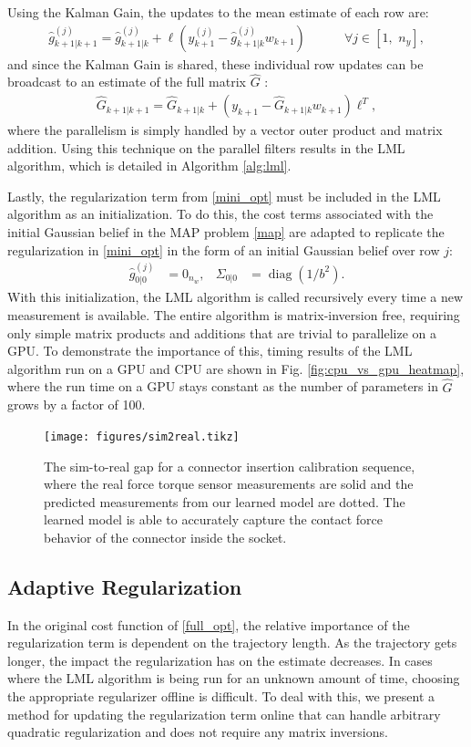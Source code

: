 Using the Kalman Gain, the updates to the mean estimate of each row are:
%
\begin{align}
    \hat{g}^{(j)}_{k+1|k+1} = \hat{g}^{(j)}_{k+1|k} + \ell (y_{k+1}^{(j)} - \hat{g}^{(j)}_{k+1|k} w_{k+1}) \quad \quad \quad \forall j \in [1, \,\,n_y],
\end{align}
%
and since the Kalman Gain is shared, these individual row updates can be broadcast to an estimate of the full matrix $\hat{G}$ :
\begin{align}
    \hat{G}_{k+1|k+1} = \hat{G}_{k+1|k} + (y_{k+1} - \hat{G}_{k+1|k} w_{k+1})\ell^T,
\end{align}
where the parallelism is simply handled by a vector outer product and matrix addition. Using this technique on the parallel filters results in the LML algorithm, which is detailed in Algorithm \ref{alg:lml}.

Lastly, the regularization term from \eqref{mini_opt} must be included in the LML algorithm as an initialization. To do this, the cost terms associated with the initial Gaussian belief in the MAP problem \eqref{map} are adapted to replicate the regularization in \eqref{mini_opt} in the form of an initial Gaussian belief over row $j$:
%
\begin{align}
    \hat{g}^{(j)}_{0|0} &= 0_{n_w}, & \Sigma_{0|0} &= \operatorname{diag}(1 / b^2). \label{eq:init_reg}
\end{align}
%
With this initialization, the LML algorithm is called recursively every time a new measurement is available. The entire algorithm is matrix-inversion free, requiring only simple matrix products and additions that are trivial to parallelize on a GPU. To demonstrate the importance of this, timing results of the LML algorithm run on a GPU and CPU are shown in Fig. \ref{fig:cpu_vs_gpu_heatmap}, where the run time on a GPU stays constant as the number of parameters in $\hat{G}$ grows by a factor of 100. 
%
\begin{figure}
    \centering
    \texttt{[image: figures/sim2real.tikz]}
    \caption{The sim-to-real gap for a connector insertion calibration sequence, where the real force torque sensor measurements are solid and the predicted measurements from our learned model are dotted.  The learned model is able to accurately capture the contact force behavior of the connector inside the socket.}
    \label{fig:sim2real}
\end{figure}


\subsection{Adaptive Regularization}
%
In the original cost function of \eqref{full_opt}, the relative importance of the regularization term is dependent on the trajectory length.  As the trajectory gets longer, the impact the regularization has on the estimate decreases. In cases where the LML algorithm is being run for an unknown amount of time, choosing the appropriate regularizer offline is difficult. To deal with this, we present a method for updating the regularization term online that can handle arbitrary quadratic regularization and does not require any matrix inversions. 

